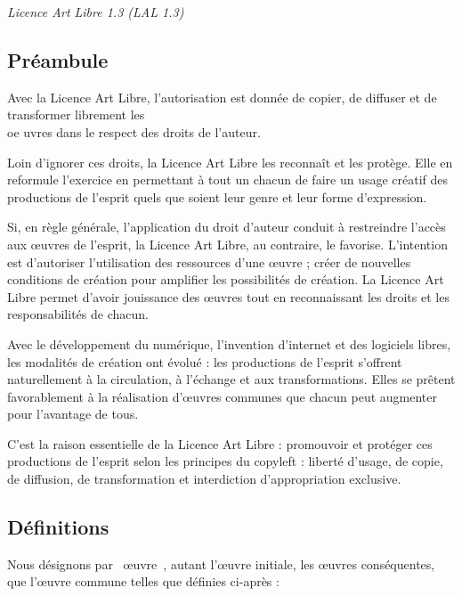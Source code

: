 \emph{Licence Art Libre 1.3 (LAL 1.3)}

\subsection{Pr\'eambule}

Avec la Licence Art Libre, l'autorisation est donn\'ee de copier, de diffuser et de transformer librement les \\oe  uvres dans le respect des droits de l'auteur.

Loin d'ignorer ces droits, la Licence Art Libre les reconna\^it et les prot\`ege. Elle en reformule l'exercice en permettant \`a tout un chacun de faire un usage cr\'eatif des productions de l'esprit quels que soient leur genre et leur forme d'expression.

Si, en r\`egle g\'en\'erale, l'application du droit d'auteur conduit \`a restreindre l'acc\`es aux \oe uvres de l'esprit, la Licence Art Libre, au contraire, le favorise. L'intention est d'autoriser l'utilisation des ressources d'une \oe uvre ; cr\'eer de nouvelles conditions de cr\'eation pour amplifier les possibilit\'es de cr\'eation. La Licence Art Libre permet d'avoir jouissance des \oe uvres tout en reconnaissant les droits et les responsabilit\'es de chacun.

Avec le d\'eveloppement du num\'erique, l'invention d'internet et des logiciels libres, les modalit\'es de cr\'eation ont \'evolu\'e : les productions de l'esprit s'offrent naturellement \`a la circulation, \`a l'\'echange et aux transformations. Elles se pr\^etent favorablement \`a la r\'ealisation d'\oe uvres communes que chacun peut augmenter pour l'avantage de tous.

C'est la raison essentielle de la Licence Art Libre : promouvoir et prot\'eger ces productions de l'esprit selon les principes du copyleft : libert\'e d'usage, de copie, de diffusion, de transformation et interdiction d'appropriation exclusive.

\subsection{D\'efinitions}

Nous d\'esignons par \og~\oe uvre~\fg, autant l'\oe uvre initiale, les \oe uvres cons\'equentes, que l'\oe uvre commune telles que d\'efinies ci-apr\`es :

